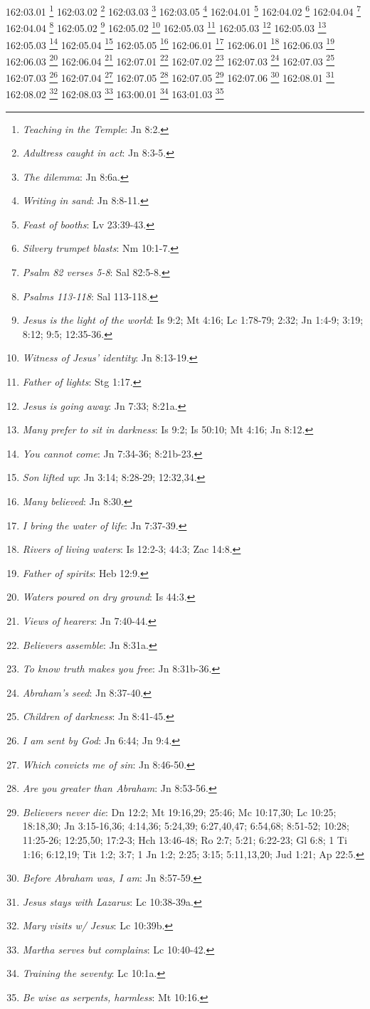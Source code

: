 {{{{{{{{{{{{{{{{{{{{{{{{{{{{{{{{{{{{162:03.01 \footnote{\textit{Teaching in the Temple}: Jn 8:2.}
162:03.02 \footnote{\textit{Adultress caught in act}: Jn 8:3-5.}
162:03.03 \footnote{\textit{The dilemma}: Jn 8:6a.}
162:03.05 \footnote{\textit{Writing in sand}: Jn 8:8-11.}
162:04.01 \footnote{\textit{Feast of booths}: Lv 23:39-43.}
162:04.02 \footnote{\textit{Silvery trumpet blasts}: Nm 10:1-7.}
162:04.04 \footnote{\textit{Psalm 82 verses 5-8}: Sal 82:5-8.}
162:04.04 \footnote{\textit{Psalms 113-118}: Sal 113-118.}
162:05.02 \footnote{\textit{Jesus is the light of the world}: Is 9:2; Mt 4:16; Lc 1:78-79; 2:32; Jn 1:4-9; 3:19; 8:12; 9:5; 12:35-36.}
162:05.02 \footnote{\textit{Witness of Jesus' identity}: Jn 8:13-19.}
162:05.03 \footnote{\textit{Father of lights}: Stg 1:17.}
162:05.03 \footnote{\textit{Jesus is going away}: Jn 7:33; 8:21a.}
162:05.03 \footnote{\textit{Many prefer to sit in darkness}: Is 9:2; Is 50:10; Mt 4:16; Jn 8:12.}
162:05.03 \footnote{\textit{You cannot come}: Jn 7:34-36; 8:21b-23.}
162:05.04 \footnote{\textit{Son lifted up}: Jn 3:14; 8:28-29; 12:32,34.}
162:05.05 \footnote{\textit{Many believed}: Jn 8:30.}
162:06.01 \footnote{\textit{I bring the water of life}: Jn 7:37-39.}
162:06.01 \footnote{\textit{Rivers of living waters}: Is 12:2-3; 44:3; Zac 14:8.}
162:06.03 \footnote{\textit{Father of spirits}: Heb 12:9.}
162:06.03 \footnote{\textit{Waters poured on dry ground}: Is 44:3.}
162:06.04 \footnote{\textit{Views of hearers}: Jn 7:40-44.}
162:07.01 \footnote{\textit{Believers assemble}: Jn 8:31a.}
162:07.02 \footnote{\textit{To know truth makes you free}: Jn 8:31b-36.}
162:07.03 \footnote{\textit{Abraham's seed}: Jn 8:37-40.}
162:07.03 \footnote{\textit{Children of darkness}: Jn 8:41-45.}
162:07.03 \footnote{\textit{I am sent by God}: Jn 6:44; Jn 9:4.}
162:07.04 \footnote{\textit{Which convicts me of sin}: Jn 8:46-50.}
162:07.05 \footnote{\textit{Are you greater than Abraham}: Jn 8:53-56.}
162:07.05 \footnote{\textit{Believers never die}: Dn 12:2; Mt 19:16,29; 25:46; Mc 10:17,30; Lc 10:25; 18:18,30; Jn 3:15-16,36; 4:14,36; 5:24,39; 6:27,40,47; 6:54,68; 8:51-52; 10:28; 11:25-26; 12:25,50; 17:2-3; Hch 13:46-48; Ro 2:7; 5:21; 6:22-23; Gl 6:8; 1 Ti 1:16; 6:12,19; Tit 1:2; 3:7; 1 Jn 1:2; 2:25; 3:15; 5:11,13,20; Jud 1:21; Ap 22:5.}
162:07.06 \footnote{\textit{Before Abraham was, I am}: Jn 8:57-59.}
162:08.01 \footnote{\textit{Jesus stays with Lazarus}: Lc 10:38-39a.}
162:08.02 \footnote{\textit{Mary visits w/ Jesus}: Lc 10:39b.}
162:08.03 \footnote{\textit{Martha serves but complains}: Lc 10:40-42.}
163:00.01 \footnote{\textit{Training the seventy}: Lc 10:1a.}
163:01.03 \footnote{\textit{Be wise as serpents, harmless}: Mt 10:16.}
}}}}}}}}}}}}}}}}}}}}}}}}}}}}}}}}}}}}
